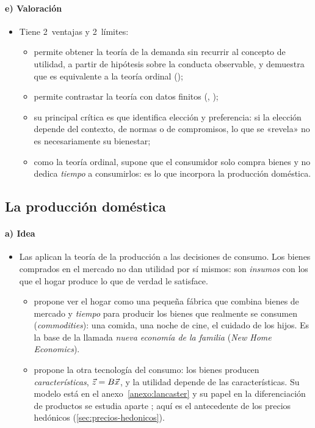 \documentclass[11pt]{article}
\begin{document}
\paragraph{e) Valoración}

\begin{itemize}
\item Tiene 2~ventajas y 2~límites:
  \begin{itemize}
  \item permite obtener la teoría de la demanda sin recurrir al concepto de utilidad, a partir de hipótesis sobre la conducta observable, y demuestra que es equivalente a la teoría ordinal ();
  \item permite contrastar la teoría con datos finitos (, );
  \item su principal crítica es que identifica elección y preferencia\nocite{Sen1973Behaviour}: si la elección depende del contexto, de normas o de compromisos, lo que se «revela» no es necesariamente su bienestar;
  \item como la teoría ordinal, supone que el consumidor solo compra bienes y no dedica \emph{tiempo} a consumirlos: es lo que incorpora la producción doméstica.
  \end{itemize}
\end{itemize}

\subsection{La producción doméstica}\label{sec:produccion-domestica}

\paragraph{a) Idea}

\begin{itemize}
\item Las  aplican la teoría de la producción a las decisiones de consumo. Los bienes comprados en el mercado no dan utilidad por sí mismos: son \emph{insumos} con los que el hogar produce lo que de verdad le satisface.
  \begin{itemize}
  \item \textcite{Becker1965Allocation} propone ver el hogar como una pequeña fábrica que combina bienes de mercado y \emph{tiempo} para producir los bienes que realmente se consumen (\emph{commodities}): una comida, una noche de cine, el cuidado de los hijos. Es la base de la llamada \emph{nueva economía de la familia} (\emph{New Home Economics}).
  \item \textcite{Lancaster1966New} propone la otra tecnología del consumo: los bienes producen \emph{características}, $\vec{z}=B\vec{x}$, y la utilidad depende de las características. Su modelo está en el anexo~\ref{anexo:lancaster} y su papel en la diferenciación de productos se estudia aparte ; aquí es el antecedente de los precios hedónicos (\ref{sec:precios-hedonicos}).
  \end{itemize}
\end{itemize}
\end{document}
